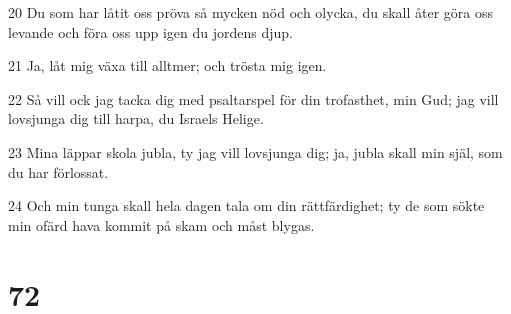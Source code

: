\par 20 Du som har låtit oss pröva så mycken nöd och olycka, du skall åter göra oss levande och föra oss upp igen du jordens djup.
\par 21 Ja, låt mig växa till alltmer; och trösta mig igen.
\par 22 Så vill ock jag tacka dig med psaltarspel för din trofasthet, min Gud; jag vill lovsjunga dig till harpa, du Israels Helige.
\par 23 Mina läppar skola jubla, ty jag vill lovsjunga dig; ja, jubla skall min själ, som du har förlossat.
\par 24 Och min tunga skall hela dagen tala om din rättfärdighet; ty de som sökte min ofärd hava kommit på skam och måst blygas.

\chapter{72}

